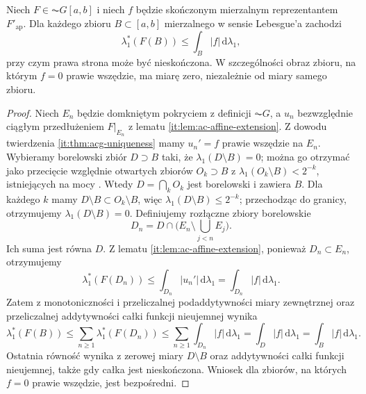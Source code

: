\begin{twierdzenie}
\label{it:thm:acg-image-bound}
Niech $F\in\AC G[a,b]$ i niech $f$ będzie skończonym
mierzalnym reprezentantem $F'_{\mathrm{ap}}$.
Dla każdego zbioru $B\subset[a,b]$ mierzalnego w sensie
Lebesgue'a zachodzi
\[
 \lambda_1^*(F(B))\le \int_B |f|\,\mathrm d\lambda_1,
\]
przy czym prawa strona może być nieskończona.
W szczególności obraz zbioru, na którym $f=0$ prawie
wszędzie, ma miarę zero, niezależnie od miary samego
zbioru.
\end{twierdzenie}
\begin{proof}
Niech $E_n$ będzie domkniętym pokryciem z definicji
$\AC G$, a $u_n$ bezwzględnie ciągłym przedłużeniem
$F|_{E_n}$ z lematu \ref{it:lem:ac-affine-extension}.
Z dowodu twierdzenia \ref{it:thm:acg-uniqueness} mamy
$u_n'=f$ prawie wszędzie na $E_n$.
Wybieramy borelowski zbiór $D\supset B$ taki, że
$\lambda_1(D\setminus B)=0$; można go otrzymać jako przecięcie względnie otwartych
zbiorów $O_k\supset B$ z $\lambda_1(O_k\setminus B)<2^{-k}$,
istniejących na mocy .
Wtedy $D=\bigcap_k O_k$ jest borelowski i zawiera $B$.
Dla każdego $k$ mamy $D\setminus B\subset O_k\setminus B$,
więc $\lambda_1(D\setminus B)\le2^{-k}$; przechodząc do granicy,
otrzymujemy $\lambda_1(D\setminus B)=0$. Definiujemy rozłączne
zbiory borelowskie
\[
 D_n=D\cap\bigl(E_n\setminus\bigcup_{j<n}E_j\bigr).
\]
Ich suma jest równa $D$. Z lematu
\ref{it:lem:ac-affine-extension}, ponieważ $D_n\subset E_n$,
otrzymujemy
\[
 \lambda_1^*(F(D_n))
 \le\int_{D_n}|u_n'|\,\mathrm d\lambda_1
 =\int_{D_n}|f|\,\mathrm d\lambda_1.
\]
Zatem z monotoniczności i przeliczalnej podaddytywności
miary zewnętrznej oraz przeliczalnej addytywności całki
funkcji nieujemnej wynika
\[
 \lambda_1^*(F(B))
 \le\sum_{n\ge1}\lambda_1^*(F(D_n))
 \le\sum_{n\ge1}\int_{D_n}|f|\,\mathrm d\lambda_1
 =\int_D|f|\,\mathrm d\lambda_1
 =\int_B|f|\,\mathrm d\lambda_1.
\]
Ostatnia równość wynika z zerowej miary $D\setminus B$
oraz addytywności całki funkcji nieujemnej, także gdy całka jest nieskończona.
Wniosek dla zbiorów, na których $f=0$ prawie wszędzie,
jest bezpośredni.
\end{proof}

